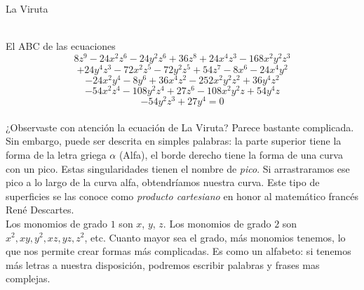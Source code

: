 \documentclass[es]{../../common/SurferDesc}%
\begin{document}
\footnotesize




\begin{surferPage}
  \begin{surferTitle}La Viruta\end{surferTitle} \\
El ABC de las ecuaciones
\[8z^9-24x^2z^6-24y^2z^6+36z^8+24x^4z^3-168x^2y^2z^3\]
\[+24y^4z^3-72x^2z^5-72y^2z^5+54z^7-8x^6-24x^4y^2\]
\[-24x^2y^4-8y^6 + 36x^4z^2-252x^2y^2z^2+36y^4z^2\]
\[- 54x^2z^4-108y^2z^4 + 27z^6-108x^2y^2z + 54y^4z\]
\[-54y^2z^3 + 27y^4 = 0\]\\
\vspace{0.25cm}
¿Observaste con atención la ecuación de La Viruta? Parece bastante complicada.
Sin embargo, puede ser descrita en simples palabras: la parte superior tiene la forma de la letra griega $\alpha$ (Alfa), el borde derecho tiene la forma de una curva con un pico. Estas singularidades tienen el nombre de {\it pico}. Si arrastraramos ese pico a lo largo de la curva alfa, obtendríamos nuestra curva. Este tipo de superficies se las conoce como {\it producto cartesiano} en honor al matemático francés Ren\'e Descartes.\\
\vspace{0.25cm}
Los monomios de grado $1$ son $x$, $y$, $z$. Los monomios de grado $2$ son $x^2, xy, y^2, xz, yz, z^2$, etc. Cuanto mayor sea el grado, más monomios tenemos, lo que nos permite crear formas más complicadas. Es como un alfabeto: si tenemos más letras a nuestra disposición, podremos escribir palabras y frases mas complejas. 




  \begin{surferText}
     \end{surferText}
\end{surferPage}
\end{document}
